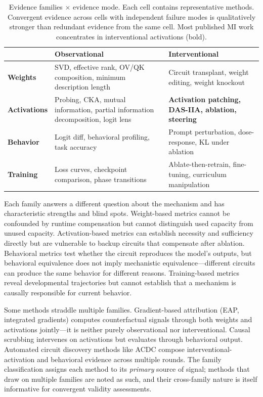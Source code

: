 \documentclass{article}
\begin{document}
\begin{table}[H]
\centering
\small
\caption{Evidence families $\times$ evidence mode. Each cell contains representative methods. Convergent evidence across cells with independent failure modes is qualitatively stronger than redundant evidence from the same cell. Most published MI work concentrates in interventional activations (bold).}
\label{tab:families}
\renewcommand{\arraystretch}{1.25}
\begin{tabular}{@{}l>{\raggedright\arraybackslash}p{5.8cm}>{\raggedright\arraybackslash}p{5.8cm}@{}}
\toprule
& \textbf{Observational} & \textbf{Interventional} \\
\midrule
\textbf{Weights} & SVD, effective rank, OV/QK composition, minimum description length & Circuit transplant, weight editing, weight knockout \\
\midrule
\textbf{Activations} & Probing, CKA, mutual information, partial information decomposition, logit lens & \textbf{Activation patching, DAS-IIA, ablation, steering} \\
\midrule
\textbf{Behavior} & Logit diff, behavioral profiling, task accuracy & Prompt perturbation, dose-response, KL under ablation \\
\midrule
\textbf{Training} & Loss curves, checkpoint comparison, phase transitions & Ablate-then-retrain, fine-tuning, curriculum manipulation \\
\bottomrule
\end{tabular}
\end{table}

Each family answers a different question about the mechanism and has characteristic strengths and blind spots. Weight-based metrics cannot be confounded by runtime compensation but cannot distinguish used capacity from unused capacity. Activation-based metrics can establish necessity and sufficiency directly but are vulnerable to backup circuits that compensate after ablation. Behavioral metrics test whether the circuit reproduces the model's outputs, but behavioral equivalence does not imply mechanistic equivalence---different circuits can produce the same behavior for different reasons. Training-based metrics reveal developmental trajectories but cannot establish that a mechanism is causally responsible for current behavior.

Some methods straddle multiple families. Gradient-based attribution (EAP, integrated gradients) computes counterfactual signals through both weights and activations jointly---it is neither purely observational nor interventional. Causal scrubbing intervenes on activations but evaluates through behavioral output. Automated circuit discovery methods like ACDC compose interventional-activation and behavioral evidence across multiple rounds. The family classification assigns each method to its \emph{primary} source of signal; methods that draw on multiple families are noted as such, and their cross-family nature is itself informative for convergent validity assessments.
\end{document}
